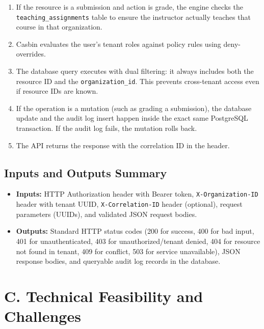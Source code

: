 \documentclass{article}
\begin{document}
\begin{enumerate}
    \item If the resource is a submission and action is grade, the engine checks the \texttt{teaching\_assignments} table to ensure the instructor actually teaches that course in that organization.
    \item Casbin evaluates the user's tenant roles against policy rules using deny-overrides.
    \item The database query executes with dual filtering: it always includes both the resource ID and the \texttt{organization\_id}. This prevents cross-tenant access even if resource IDs are known.
    \item If the operation is a mutation (such as grading a submission), the database update and the audit log insert happen inside the exact same PostgreSQL transaction. If the audit log fails, the mutation rolls back.
    \item The API returns the response with the correlation ID in the header.
\end{enumerate}

\subsection*{Inputs and Outputs Summary}
\begin{itemize}
    \item \textbf{Inputs:} HTTP Authorization header with Bearer token, \texttt{X-Organization-ID} header with tenant UUID, \texttt{X-Correlation-ID} header (optional), request parameters (UUIDs), and validated JSON request bodies.
    \item \textbf{Outputs:} Standard HTTP status codes (200 for success, 400 for bad input, 401 for unauthenticated, 403 for unauthorized/tenant denied, 404 for resource not found in tenant, 409 for conflict, 503 for service unavailable), JSON response bodies, and queryable audit log records in the database.
\end{itemize}

\section*{C. Technical Feasibility and Challenges}
\end{document}
